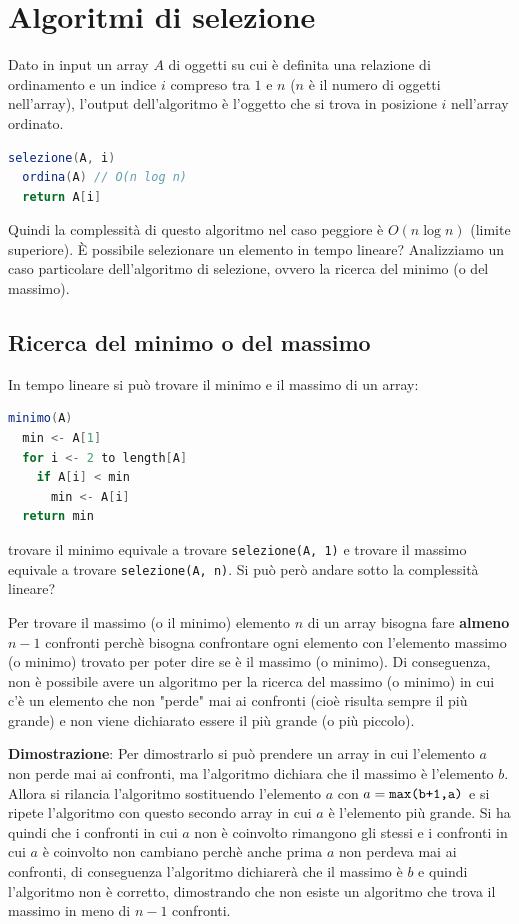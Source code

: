\documentclass[a4paper]{article}
\begin{document}
\section{Algoritmi di selezione}
Dato in input un array \( A \) di oggetti su cui è definita una relazione di ordinamento
e un indice \( i \) compreso tra \( 1 \) e \( n \) (\( n \) è il numero di oggetti
nell'array), l'output dell'algoritmo è l'oggetto che si trova in posizione \( i \)
nell'array ordinato.
\begin{lstlisting}[language=Scala]
selezione(A, i)
  ordina(A) // O(n log n)
  return A[i]
\end{lstlisting}
Quindi la complessità di questo algoritmo nel caso peggiore è \( O(n \log n) \)
(limite superiore). È possibile selezionare un elemento in tempo lineare? Analizziamo
un caso particolare dell'algoritmo di selezione, ovvero la ricerca del minimo (o del massimo).


\subsection{Ricerca del minimo o del massimo}
\vspace{1em}
\noindent
In tempo lineare si può trovare il minimo e il massimo
di un array:
\begin{lstlisting}[language=Scala]
minimo(A)
  min <- A[1]
  for i <- 2 to length[A]
    if A[i] < min
      min <- A[i]
  return min
\end{lstlisting}
trovare il minimo equivale a trovare \texttt{selezione(A, 1)} e trovare il massimo
equivale a trovare \texttt{selezione(A, n)}. Si può però andare sotto la complessità
lineare?

\vspace{1em}
\noindent
Per trovare il massimo (o il minimo) elemento \( n \) di un array bisogna fare
\textbf{almeno} \( n-1 \) confronti perchè bisogna confrontare ogni elemento con
l'elemento massimo (o minimo) trovato per poter dire se è il massimo (o minimo).
Di conseguenza, non è possibile avere un algoritmo per la ricerca del massimo (o minimo)
in cui c'è un elemento che non "perde" mai ai confronti (cioè risulta sempre il più
grande) e non viene dichiarato essere il più grande (o più piccolo).

\vspace{1em}
\noindent
\textbf{Dimostrazione}:
Per dimostrarlo si può prendere un array in cui l'elemento \( a \) non perde mai ai
confronti, ma l'algoritmo dichiara che il massimo è l'elemento \( b \). Allora si rilancia
l'algoritmo sostituendo l'elemento \( a \) con \( a = \text{\texttt{max(b+1,a)}} \) e si
ripete l'algoritmo con questo secondo array in cui \( a \) è l'elemento più grande. Si ha
quindi che i confronti in cui \( a \) non è coinvolto rimangono gli stessi e i confronti
in cui \( a \) è coinvolto non cambiano perchè anche prima \( a \) non perdeva mai ai
confronti, di conseguenza l'algoritmo dichiarerà che il massimo è \( b \) e quindi
l'algoritmo non è corretto, dimostrando che non esiste un algoritmo che trova il massimo
in meno di \( n-1 \) confronti.
\end{document}
